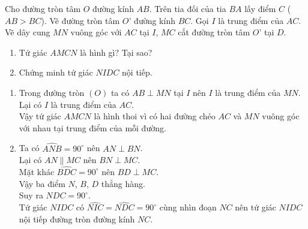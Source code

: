 \begin{bt}%
 Cho đường tròn tâm $O$ đường kính $AB$. Trên tia đối của tia $BA$ lấy điểm $C$ ($AB>BC$). Vẽ đường tròn tâm $O’$ đường kính $BC$. Gọi $I$ là trung điểm của $AC$. Vẽ dây cung $MN$ vuông góc với $AC$ tại $I$, $MC$ cắt đường tròn tâm $O’$ tại $D$.
 \begin{enumerate}
  \item Tứ giác $AMCN$ là hình gì? Tại sao?
  \item Chứng minh tứ giác $NIDC$ nội tiếp.
 \end{enumerate}
 \loigiai
  {
  \begin{enumerate}
   \item
   \immini
   {
   Trong đường tròn $(O)$ ta có $AB \perp MN$ tại $I$ nên $I$ là trung điểm của $MN$.\\
   Lại có $I$ là trung điểm của $AC$.\\
   Vậy tứ giác $AMCN$ là hình thoi vì có hai đường chéo $AC$ và $MN$ vuông góc với nhau tại trung điểm của mỗi đường.
   }
   {
   }
   \item Ta có $\widehat{ANB}=90^\circ$ nên $AN \perp BN$.\\
   Lại có $AN \parallel MC$ nên $BN \perp MC$.\\
   Mặt khác $\widehat{BDC}=90^\circ$ nên $BD \perp MC$.\\
   Vậy ba điểm $N$, $B$, $D$ thẳng hàng.\\
   Suy ra $\widehat{NDC}=90^\circ$.\\
   Tứ giác $NIDC$ có $\widehat{NIC}=\widehat{NDC}=90^\circ$ cùng nhìn đoạn $NC$ nên tứ giác $NIDC$ nội tiếp đường tròn đường kính $NC$.
  \end{enumerate}
  }
\end{bt}

